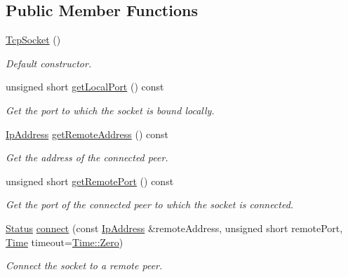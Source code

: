 \subsection*{Public Member Functions}
\begin{DoxyCompactItemize}
\item 
\mbox{\label{classsf_1_1_tcp_socket_a62a9bf81fd7f15fedb29fd1348483236}} 
\hyperlink{classsf_1_1_tcp_socket_a62a9bf81fd7f15fedb29fd1348483236}{Tcp\+Socket} ()
\begin{DoxyCompactList}\small\item\em Default constructor. \end{DoxyCompactList}\item 
unsigned short \hyperlink{classsf_1_1_tcp_socket_a98e45f0f49af1fd99216b9195e86d86b}{get\+Local\+Port} () const
\begin{DoxyCompactList}\small\item\em Get the port to which the socket is bound locally. \end{DoxyCompactList}\item 
\hyperlink{classsf_1_1_ip_address}{Ip\+Address} \hyperlink{classsf_1_1_tcp_socket_aa8579c203b1fd21beb74d7f76444a94c}{get\+Remote\+Address} () const
\begin{DoxyCompactList}\small\item\em Get the address of the connected peer. \end{DoxyCompactList}\item 
unsigned short \hyperlink{classsf_1_1_tcp_socket_a93bced0afd4b1c60797a85725be04951}{get\+Remote\+Port} () const
\begin{DoxyCompactList}\small\item\em Get the port of the connected peer to which the socket is connected. \end{DoxyCompactList}\item 
\hyperlink{classsf_1_1_socket_a51bf0fd51057b98a10fbb866246176dc}{Status} \hyperlink{classsf_1_1_tcp_socket_a68cd42d5ab70ab54b16787f555951c40}{connect} (const \hyperlink{classsf_1_1_ip_address}{Ip\+Address} \&remote\+Address, unsigned short remote\+Port, \hyperlink{classsf_1_1_time}{Time} timeout=\hyperlink{classsf_1_1_time_a8db127b632fa8da21550e7282af11fa0}{Time\+::\+Zero})
\begin{DoxyCompactList}\small\item\em Connect the socket to a remote peer. \end{DoxyCompactList}\item 

\end{DoxyCompactItemize}
